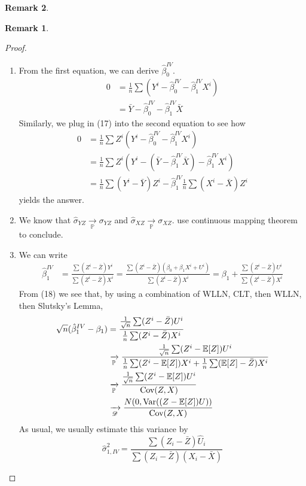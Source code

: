 \documentclass[10pt, oneside]{article}
\newcommand{\bbP}{\mathbb{P}}
\newcommand{\Var}{\text{Var}}
\newcommand{\Cov}{\text{Cov}}
\newcommand{\bbE}{\mathbb{E}}
\theoremstyle{definition}
\newtheorem{rem}{Remark}
\begin{document}
\begin{rem}
\begin{rem}
\begin{proof}
    \begin{enumerate}
        \item From the first equation, we can derive $\hat\beta_0^{IV}.$
        \begin{align*}
            0 &= \frac{1}{n}\sum(Y^i - \hat\beta_0^{IV} - \hat\beta_1^{IV} X^i)\\
            &= \bar Y - \hat\beta_0^{IV} - \hat\beta_1^{IV} \bar X
        \end{align*} Similarly, we plug in (17) into the second equation to see how 
        \begin{align*}
            0 &= \frac{1}{n}\sum Z^i(Y^i - \hat\beta_0^{IV} - \hat\beta_1^{IV} X^i)\\
            &= \frac{1}{n}\sum Z^i(Y^i - (\bar Y - \hat\beta_1^{IV} \bar X) - \hat\beta_1^{IV} X^i)\\
            &= \frac{1}{n}\sum (Y^i - \bar Y)Z^i - \hat\beta_1^{IV} \frac{1}{n}\sum (X^i - \bar X)Z^i
        \end{align*}
        yields the answer.
        \item We know that $\hat\sigma_{YZ} \xrightarrow[\bbP]{}\sigma_{YZ}$ and $\hat \sigma_{XZ}\xrightarrow[\bbP]{}\sigma_{XZ}.$  use continuous mapping theorem to conclude.
        \item We can write
        \begin{align}
            \hat\beta_1 ^{IV}&= \frac{\sum (Z^i  - \bar Z)Y^i}{\sum (Z^i - \bar Z)X^i}=\frac{\sum (Z^i  - \bar Z)(\beta_0 + \beta_1X^i + U^i)}{\sum (Z^i - \bar Z)X^i} = \beta_1  + \frac{\sum(Z^i - \bar Z)U^i}{\sum (Z^i - \bar Z)X^i}
        \end{align}
        From (18) we see that, by using a combination of WLLN, CLT, then WLLN, then Slutsky's Lemma, 
        \begin{align*}
            \sqrt{n}(\hat\beta_1^{IV} - \beta_1) &= \frac{\frac{1}{\sqrt{n}}\sum(Z^i - \bar Z)U^i}{\frac{1}{n}\sum(Z^i - \bar Z)X^i}\\
            &\xrightarrow[\cal \bbP]{} \frac{\frac{1}{\sqrt{n}}\sum(Z^i - \bbE[Z])U^i}{\frac{1}{n}\sum(Z^i - \bbE[Z])X^i + \frac{1}{n}\sum (\bbE[Z] - \bar Z)X^i}\\
            &\xrightarrow[ \bbP]{} \frac{\frac{1}{\sqrt{n}}\sum(Z^i - \bbE[Z])U^i}{\Cov(Z,X)}\\
            &\xrightarrow[\cal D]{}\frac{N(0, \Var((Z - \bbE[Z])U))}{\Cov(Z,X)}
        \end{align*}
        As usual, we usually estimate this variance by 
            \[\hat\sigma_{1, IV}^2 = \frac{\sum (Z_i - \bar Z)\hat U_i}{\sum (Z_i - \bar Z)(X_i - \bar X)}\]
    \end{enumerate}
\end{proof}


\end{rem}
\end{rem}
\end{document}
